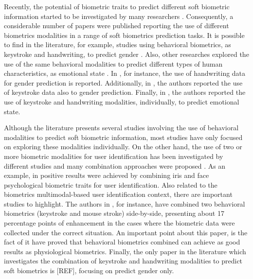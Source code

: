 \documentclass[conference]{IEEEtran}
\begin{document}
Recently,  the potential of biometric traits to predict different soft biometric information started to be investigated by many researchers \cite{cheng-hw-gender, hw-gender1, ks-emotion1, cheng-emotional, cheng-thesis}. 
Consequently, a considerable number of papers were published reporting the use of different biometrics modalities in a range of soft biometrics prediction tasks. It is possible to find in the literature, for example,  studies using behavioral biometrics, as keystroke and handwriting, to predict gender \cite{cheng-hw-gender, hw-gender1}. 
Also, other researches explored the use of the same behavioral modalities to predict different types of human characteristics, as emotional state \cite{ks-emotion1, cheng-emotional, cheng-thesis}. In \cite{hw-gender1, hw-gender2, hw-gender3}, for instance, the use of handwriting data for gender prediction is reported. Additionally, in \cite{cheng-thesis, ks-gender1}, the authors reported the use of keystroke data also to gender prediction. Finally, in \cite{cheng-emotional, ks-emotion1, ks-emotion2-mouse}, the authors reported the use of keystroke and handwriting modalities, individually, to predict emotional state.

Although the literature presents several studies involving the use of behavioral modalities to predict soft biometric information, most studies have only focused on exploring these modalities individually. On the other hand, the use of two or more biometric modalities for user identification has been investigated by different studies and many combination approaches were proposed \cite{multimodal-biometrics, multibiometric, handbook-multibiometrics}. As an example, in \cite{face-iris-comb} positive results were achieved by combining iris and face psychological biometric traits for user identification. 
Also related to the biometrics multimodal-based user identification context, there are important studies to highlight. The authors in \cite{marjorie-comb}, for instance, have combined two behavioral biometrics (keystroke and mouse stroke) side-by-side, presenting about 17 percentage points of enhancement in the cases where the biometric data were collected under the correct situation. An important point about this paper, is the fact of it have proved that behavioral biometrics combined can achieve as good results as physiological biometrics.
Finally, the only paper in the literature which investigates the combination  
of keystroke and handwriting modalities to predict soft biometrics is [REF], focusing on predict gender only.
\end{document}
